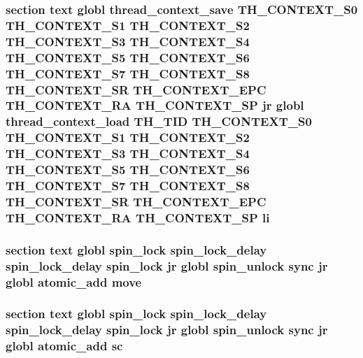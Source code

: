 \hypertarget{mips_2atomic_8S_acbf877530fdc34fc0b39616c59070e69}{
\subsubsection[{li}]{\setlength{\rightskip}{0pt plus 5cm}section text globl {\bf thread\-\_\-context\-\_\-save} {\bf T\-H\-\_\-\-C\-O\-N\-T\-E\-X\-T\-\_\-\-S0} {\bf T\-H\-\_\-\-C\-O\-N\-T\-E\-X\-T\-\_\-\-S1} {\bf T\-H\-\_\-\-C\-O\-N\-T\-E\-X\-T\-\_\-\-S2} {\bf T\-H\-\_\-\-C\-O\-N\-T\-E\-X\-T\-\_\-\-S3} {\bf T\-H\-\_\-\-C\-O\-N\-T\-E\-X\-T\-\_\-\-S4} {\bf T\-H\-\_\-\-C\-O\-N\-T\-E\-X\-T\-\_\-\-S5} {\bf T\-H\-\_\-\-C\-O\-N\-T\-E\-X\-T\-\_\-\-S6} {\bf T\-H\-\_\-\-C\-O\-N\-T\-E\-X\-T\-\_\-\-S7} {\bf T\-H\-\_\-\-C\-O\-N\-T\-E\-X\-T\-\_\-\-S8} {\bf T\-H\-\_\-\-C\-O\-N\-T\-E\-X\-T\-\_\-\-S\-R} {\bf T\-H\-\_\-\-C\-O\-N\-T\-E\-X\-T\-\_\-\-E\-P\-C} {\bf T\-H\-\_\-\-C\-O\-N\-T\-E\-X\-T\-\_\-\-R\-A} {\bf T\-H\-\_\-\-C\-O\-N\-T\-E\-X\-T\-\_\-\-S\-P} jr globl {\bf thread\-\_\-context\-\_\-load} {\bf T\-H\-\_\-\-T\-I\-D} {\bf T\-H\-\_\-\-C\-O\-N\-T\-E\-X\-T\-\_\-\-S0} {\bf T\-H\-\_\-\-C\-O\-N\-T\-E\-X\-T\-\_\-\-S1} {\bf T\-H\-\_\-\-C\-O\-N\-T\-E\-X\-T\-\_\-\-S2} {\bf T\-H\-\_\-\-C\-O\-N\-T\-E\-X\-T\-\_\-\-S3} {\bf T\-H\-\_\-\-C\-O\-N\-T\-E\-X\-T\-\_\-\-S4} {\bf T\-H\-\_\-\-C\-O\-N\-T\-E\-X\-T\-\_\-\-S5} {\bf T\-H\-\_\-\-C\-O\-N\-T\-E\-X\-T\-\_\-\-S6} {\bf T\-H\-\_\-\-C\-O\-N\-T\-E\-X\-T\-\_\-\-S7} {\bf T\-H\-\_\-\-C\-O\-N\-T\-E\-X\-T\-\_\-\-S8} {\bf T\-H\-\_\-\-C\-O\-N\-T\-E\-X\-T\-\_\-\-S\-R} {\bf T\-H\-\_\-\-C\-O\-N\-T\-E\-X\-T\-\_\-\-E\-P\-C} {\bf T\-H\-\_\-\-C\-O\-N\-T\-E\-X\-T\-\_\-\-R\-A} {\bf T\-H\-\_\-\-C\-O\-N\-T\-E\-X\-T\-\_\-\-S\-P} li}}\label{mips_2atomic_8S_acbf877530fdc34fc0b39616c59070e69}
\hypertarget{mips_2atomic_8S_ae7e8faf5918b8236bd4b932dacb0891d}{
\subsubsection[{move}]{\setlength{\rightskip}{0pt plus 5cm}section text globl {\bf spin\-\_\-lock} {\bf spin\-\_\-lock\-\_\-delay} {\bf spin\-\_\-lock\-\_\-delay} {\bf spin\-\_\-lock} jr globl {\bf spin\-\_\-unlock} sync jr globl {\bf atomic\-\_\-add} move}}\label{mips_2atomic_8S_ae7e8faf5918b8236bd4b932dacb0891d}
\hypertarget{mips_2atomic_8S_a994dd5c708bcbaac056b340c7cd42ceb}{
\subsubsection[{sc}]{\setlength{\rightskip}{0pt plus 5cm}section text globl {\bf spin\-\_\-lock} {\bf spin\-\_\-lock\-\_\-delay} {\bf spin\-\_\-lock\-\_\-delay} {\bf spin\-\_\-lock} jr globl {\bf spin\-\_\-unlock} sync jr globl {\bf atomic\-\_\-add} sc}}\label{mips_2atomic_8S_a994dd5c708bcbaac056b340c7cd42ceb}
